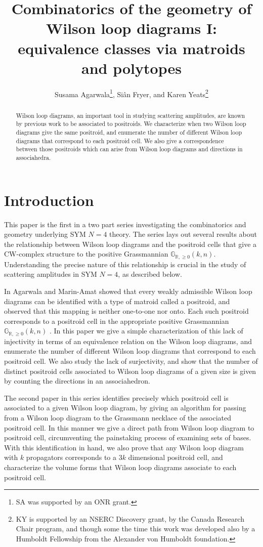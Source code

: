 \documentclass[11pt]{article}
\title{Combinatorics of the geometry of Wilson loop diagrams I: equivalence classes via matroids and polytopes}
\author{Susama Agarwala\thanks{SA was supported by an ONR grant.}, Si\^an Fryer, and Karen Yeats\thanks{KY is supported by an NSERC Discovery grant, by the Canada Research Chair program, and though some the time this work was developed also by a Humboldt Fellowship from the Alexander von Humboldt foundation.}}
\newcommand{\R}{\mathbb{R}}
\newcommand{\Gr}{\mathbb{G}_{\R, \geq 0}}
\theoremstyle{remark}
\theoremstyle{definition}
\begin{document}
\maketitle

\begin{abstract}
  Wilson loop diagrams, an important tool in studying scattering amplitudes, are known by previous work to be associated to positroids.
  We characterize when two Wilson loop diagrams give the same positroid, and enumerate the number of different Wilson loop diagrams that correspond to each positroid cell.  We also give a correspondence between those positroids which can arise from Wilson loop diagrams and directions in associahedra.
\end{abstract}



\section{Introduction}

This paper is the first in a two part series investigating the combinatorics and geometry underlying SYM $N=4$ theory. The series lays out several results about the relationship between Wilson loop diagrams and the positroid cells that give a CW-complex structure to the positive Grassmannian $\Gr(k,n)$. Understanding the precise nature of this relationship is crucial in the study of scattering amplitudes in SYM $N=4$, as described below.

In \cite{wilsonloop} Agarwala and Marin-Amat showed that every weakly admissible Wilson loop diagrams can be identified with a type of matroid called a positroid, and observed that this mapping is neither one-to-one nor onto. Each such positroid corresponds to a positroid cell in the appropriate positive Grassmannian $\Gr(k,n)$ \cite{Postnikov}. In this paper we give a simple characterization of this lack of injectivity in terms of an equivalence relation on the Wilson loop diagrams, and enumerate the number of different Wilson loop diagrams that correspond to each positroid cell. We also study the lack of surjectivity, and show that the number of distinct positroid cells associated to Wilson loop diagrams of a given size is given by counting the directions in an associahedron. 

The second paper \cite{generalcombinatoricsII} in this series identifies precisely which positroid cell is associated to a given Wilson loop diagram, by giving an algorithm for passing from a Wilson loop diagram to the Grassmann necklace of the associated positroid cell. In this manner we give a direct path from Wilson loop diagram to positroid cell, circumventing the painstaking process of examining sets of bases. With this identification in hand, we also prove that any Wilson loop diagram with $k$ propagators corresponds to a $3k$ dimensional positroid cell, and characterize the volume forms that Wilson loop diagrams associate to each positroid cell.
\end{document}

